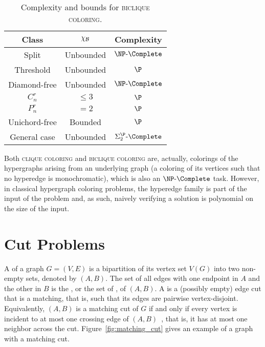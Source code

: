 \begin{table}[!htb]
    \centering
    \begin{tabular}{c|c|c}
        \hline
        \hline
        Class            & $\chi_{\mathcal{B}}$             & Complexity \\
        \hline
        Split            & Unbounded            & $\NPc$\\
        Threshold        & Unbounded            & $\P$\\
        Diamond-free     & Unbounded            & $\NPc$\\
        $C_n^r$          & $\leq 3$             & $\P$\\
        $P_n^r$          & $= 2$                & $\P$\\
        Unichord-free    & Bounded              & $\P$\\
        General case     & Unbounded            & $\SiP{2}\text{-}\Complete$\\
        \hline
        \hline
    \end{tabular}
    \caption{Complexity and bounds for \textsc{biclique coloring}.}
    \label{tab:biclique_color_complexity}
\end{table}

Both \textsc{clique coloring} and \textsc{biclique coloring} are, actually, colorings of the hypergraphs arising from an underlying graph (a coloring of its vertices such that no hyperedge is monochromatic), which is also an $\NPc$ task.
However, in classical hypergraph coloring problems, the hyperedge family is part of the input of the problem and, as such, naively verifying a solution is polynomial on the size of the input.

\section{Cut Problems}

A  of a graph $G = (V, E)$ is a bipartition of its vertex set $V(G)$ into two non-empty sets, denoted by $(A,B)$.
The set of all edges with one endpoint in $A$ and the other in $B$ is the , or the set of , of $(A,B)$.
A  is a (possibly empty) edge cut that is a matching, that is, such that its edges are pairwise vertex-disjoint. Equivalently, $(A, B)$ is a matching cut of $G$ if and only if every vertex is incident to at most one crossing edge of $(A, B)$~\citep{matching_cut_graham, chvatal_matching_cut}, that is, it has at most one neighbor across the cut.
Figure~\ref{fig:matching_cut} gives an example of a graph with a matching cut.



